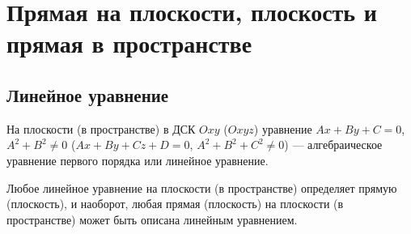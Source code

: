 \documentclass[twoside]{book}
\begin{document}
\section{Прямая на плоскости, плоскость и прямая в пространстве}
\subsection{Линейное уравнение}

На плоскости (в пространстве) в ДСК \(Oxy\) (\(Oxyz\)) уравнение \(Ax + By + C = 0\), \(A^2 + B^2 \neq 0\) (\(Ax + By + Cz + D = 0\), \(A^2 + B^2 + C^2 \neq 0\)) --- алгебраическое уравнение первого порядка или линейное уравнение.

Любое линейное уравнение на плоскости (в пространстве) определяет прямую (плоскость), и наоборот, любая прямая (плоскость) на плоскости (в пространстве) может быть описана линейным уравнением.
\end{document}

